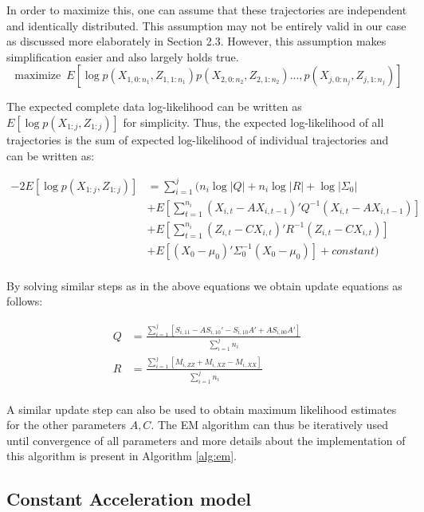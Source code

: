 \documentclass{article}
\DeclareMathOperator*{\maximize}{maximize}
\begin{document}
In order to maximize this, one can assume that these trajectories are independent and identically distributed. This assumption may not be entirely valid in our case as discussed more elaborately in Section 2.3. However, this assumption makes simplification easier and also largely holds true. 
$$\maximize \ E[\log p(X_{1,0:n_1},Z_{1,1:n_1})p(X_{2,0:n_2},Z_{2,1:n_2})...,p(X_{j,0:n_j},Z_{j,1:n_j})] $$

The expected complete data log-likelihood can be written as $E[\log p(X_{1:j},Z_{1:j})]$ for simplicity. Thus, the expected log-likelihood of all trajectories is the sum of expected log-likelihood of individual trajectories and can be written as:

\begin{equation}
\begin{split}
     -2E[\log p(X_{1:j},Z_{1:j})] &=\sum_{i=1}^j (n_i\log |Q|+n_i\log|R| + \log|\Sigma_0|\\
     &+ E[\sum_{t=1}^{n_i}(X_{i,t}-AX_{i,t-1})'Q^{-1}(X_{i,t}-AX_{i,t-1})] \\ 
 &+ E[\sum_{t=1}^{n_i}(Z_{i,t}-CX_{i,t})'R^{-1}(Z_{i,t}-CX_{i,t})]\\
 &+ E[(X_0-\mu_0)'\Sigma_0^{-1}(X_0-\mu_0)] +constant)\\
\end{split}
\end{equation}

By solving similar steps as in the above equations we obtain update equations as follows:

\begin{equation}
\begin{split}
 Q&=  \frac{\sum_{i=1}^{j}[S_{i,11}-AS_{i,10}'-S_{i,10}A'+AS_{i,00}A']}{\sum_{i=1}^{j}n_i}\\
 R&= \frac{\sum_{i=1}^{j}[M_{i,ZZ}+M_{i,XZ}-M_{i,XX}]}{\sum_{i=1}^{j}n_i}\\
\end{split}
\end{equation}

A similar update step can also be used to obtain maximum likelihood estimates for the other parameters $A,C$. The EM algorithm can thus be iteratively used until convergence of all parameters and more details about the implementation of this algorithm is present in Algorithm \ref{alg:em}. 


\subsection{Constant Acceleration model}
\end{document}
